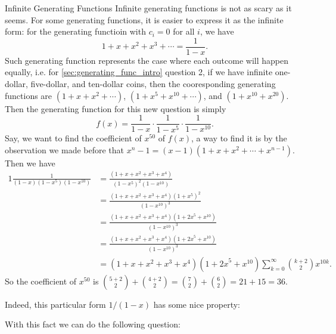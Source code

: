 \begin{mysubsection}{Infinite Generating Functions}
    Infinite generating functions is not as scary as it seems. For some generating functions, it is easier to express it as the infinite form: for the generating functioin with $c_i=0$ for all $i$, we have
    \[
        1+x+x^2+x^3+\cdots =\frac{1}{1-x}.
    \]
    Such generating function represents the case where each outcome will happen equally, i.e. for \cref{sec:generating_func_intro} question 2, if we have infinite one-dollar, five-dollar, and ten-dollar coins, then the cooresponding generating functions are $(1+x+x^2+\cdots )$, $(1+x^5+x^{10}+\cdots )$, and $(1+x^{10}+x^{20})$. Then the generating function for this new question is simply 
    \[
        f(x)=\frac{1}{1-x}\cdot \frac{1}{1-x^5}\cdot \frac{1}{1-x^{10}}.
    \]
    Say, we want to find the coefficient of $x^{50}$ of $f(x)$, a way to find it is by the observation we made before that $x^n-1=(x-1)(1+x+x^2+\cdots +x^{n-1})$. Then we have
    \begin{alignat*}{1}
        \frac{1}{\left(1-x\right)\left(1-x^5\right)\left(1-x^{10}\right)}
        &= \frac{\left(1+x+x^2+x^3+x^4\right)}{\left(1-x^5\right)^2\left(1-x^{10}\right)}\\
        &= \frac{\left(1+x+x^2+x^3+x^4\right)\left(1+x^5\right)^2}{\left(1-x^{10}\right)^3}\\
        &= \frac{\left(1+x+x^2+x^3+x^4\right)\left(1+{2x}^5+x^{10}\right)}{\left(1-x^{10}\right)^3}\\
        &= \frac{\left(1+x+x^2+x^3+x^4\right)\left(1+{2x}^5+x^{10}\right)}{\left(1-x^{10}\right)^3}\\
        &= \left(1+x+x^2+x^3+x^4\right)\left(1+{2x}^5+x^{10}\right)\sum_{k=0}^{\infty}{\binom{k+2}{2}x^{10k}}.
    \end{alignat*}
    So the coefficient of $x^{50}$ is 
    $\binom{5+2}{2}+\binom{4+2}{2}=\binom{7}{2}+\binom{6}{2}=21+15=36$.

    \newpage
    Indeed, this particular form $1/(1-x)$ has some nice property:

    \begin{shortque*}[]{}

        With this fact we can do the following question:


\end{shortque*}
\end{mysubsection}
